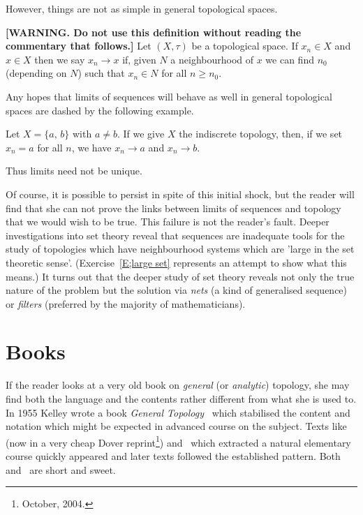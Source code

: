 However, things are not as simple in general topological spaces.
\begin{definition}{\bf [WARNING. Do not use this definition
without reading the commentary that follows.]}%
\label{R;treacherous}
Let $(X,\tau)$ be a topological space. If $x_{n}\in X$
and $x\in X$ then we say $x_{n}\rightarrow x$
if, given $N$ a neighbourhood of $x$ we can find
$n_{0}$ (depending on $N$) such that $x_{n}\in N$
for all $n\geq n_{0}$.
\end{definition}

Any hopes that limits of sequences
will behave as well in general topological spaces
are dashed by the following example.
\begin{example} Let $X=\{a,\,b\}$ with $a\neq b$.
If we give $X$ the indiscrete topology, then,
if we set $x_{n}=a$ for all $n$, we have
$x_{n}\rightarrow a$ and $x_{n}\rightarrow b$.
\end{example}
Thus limits need not be unique.

Of course, it is possible to persist in
spite of this initial shock, but the reader
will find that she can not prove the links
between limits of sequences and topology
that we would wish to be true. This failure
is not the reader's fault. Deeper investigations
into set theory reveal that sequences are
inadequate tools for the study of topologies
which have neighbourhood systems which are 'large
in the set theoretic sense'. (Exercise~\ref{E;large set}
represents an attempt to show what this means.)
It turns out that the deeper study of set theory
reveals not only the true nature of the problem
but the solution via \emph{nets} (a kind of generalised sequence)
or \emph{filters} (preferred by the majority of mathematicians).





\section{Books}

If the reader looks at a very old book on \emph{general} (or \emph{analytic}) topology, she may find both the language and the contents rather different from what she is used to. In 1955 Kelley wrote a book \emph{General Topology}~\cite{Kelley_1955} which stabilised the content and notation which might be expected in advanced course on the subject. Texts like ~\cite{Mendeleson_1990} (now in a very cheap Dover reprint\footnote{October, 2004.}) and~\cite{Mansfield_1963} which extracted a natural elementary course quickly appeared and later texts followed the established pattern. Both~\cite{Mendeleson_1990}
and~\cite{Mansfield_1963} are short and sweet.

